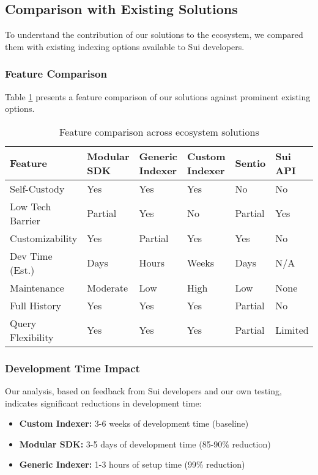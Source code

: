 \subsection{Comparison with Existing Solutions}

To understand the contribution of our solutions to the ecosystem, we compared them with existing indexing options available to Sui developers.

\subsubsection{Feature Comparison}

Table \ref{tab:ecosystem-comparison} presents a feature comparison of our solutions against prominent existing options.

\begin{table}[h]
\centering
\begin{tabular}{p{2.2cm}|p{1.2cm}|p{1.2cm}|p{1.2cm}|p{1.2cm}|p{1.2cm}}
\toprule
\textbf{Feature} & \textbf{Modular SDK} & \textbf{Generic Indexer} & \textbf{Custom Indexer} & \textbf{Sentio} & \textbf{Sui API} \\
\midrule
Self-Custody & Yes & Yes & Yes & No & No \\
Low Tech Barrier & Partial & Yes & No & Partial & Yes \\
Customizability & Yes & Partial & Yes & Yes & No \\
Dev Time (Est.) & Days & Hours & Weeks & Days & N/A \\
Maintenance & Moderate & Low & High & Low & None \\
Full History & Yes & Yes & Yes & Partial & No \\
Query Flexibility & Yes & Yes & Yes & Partial & Limited \\
\bottomrule
\end{tabular}
\caption{Feature comparison across ecosystem solutions}
\label{tab:ecosystem-comparison}
\end{table}

\subsubsection{Development Time Impact}

Our analysis, based on feedback from Sui developers and our own testing, indicates significant reductions in development time:

\begin{itemize}
    \item \textbf{Custom Indexer:} 3-6 weeks of development time (baseline)
    \item \textbf{Modular SDK:} 3-5 days of development time (85-90\% reduction)
    \item \textbf{Generic Indexer:} 1-3 hours of setup time (99\% reduction)
\end{itemize}

